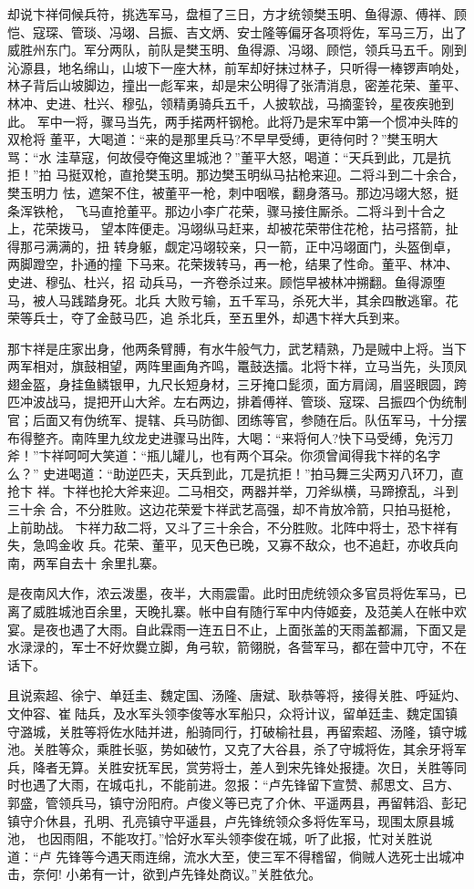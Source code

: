 却说卞祥伺候兵符，挑选军马，盘桓了三日，方才统领樊玉明、鱼得源、傅祥、顾
恺、寇琛、管琰、冯翊、吕振、吉文炳、安士隆等偏牙各项将佐，军马三万，出了
威胜州东门。军分两队，前队是樊玉明、鱼得源、冯翊、顾恺，领兵马五千。刚到
沁源县，地名绵山，山坡下一座大林，前军却好抹过林子，只听得一棒锣声响处，
林子背后山坡脚边，撞出一彪军来，却是宋公明得了张清消息，密差花荣、董平、
林冲、史进、杜兴、穆弘，领精勇骑兵五千，人披软战，马摘銮铃，星夜疾驰到此。
军中一将，骤马当先，两手掿两杆钢枪。此将乃是宋军中第一个惯冲头阵的双枪将
董平，大喝道：“来的是那里兵马?不早早受缚，更待何时？”樊玉明大骂：“水
洼草寇，何故侵夺俺这里城池？”董平大怒，喝道：“天兵到此，兀是抗拒！”拍
马挺双枪，直抢樊玉明。那边樊玉明纵马拈枪来迎。二将斗到二十余合，樊玉明力
怯，遮架不住，被董平一枪，刺中咽喉，翻身落马。那边冯翊大怒，挺条浑铁枪，
飞马直抢董平。那边小李广花荣，骤马接住厮杀。二将斗到十合之上，花荣拨马，
望本阵便走。冯翊纵马赶来，却被花荣带住花枪，拈弓搭箭，扯得那弓满满的，扭
转身躯，觑定冯翊较亲，只一箭，正中冯翊面门，头盔倒卓，两脚蹬空，扑通的撞
下马来。花荣拨转马，再一枪，结果了性命。董平、林冲、史进、穆弘、杜兴，招
动兵马，一齐卷杀过来。顾恺早被林冲搠翻。鱼得源堕马，被人马践踏身死。北兵
大败亏输，五千军马，杀死大半，其余四散逃窜。花荣等兵士，夺了金鼓马匹，追
杀北兵，至五里外，却遇卞祥大兵到来。

那卞祥是庄家出身，他两条臂膊，有水牛般气力，武艺精熟，乃是贼中上将。当下
两军相对，旗鼓相望，两阵里画角齐鸣，鼍鼓迭擂。北将卞祥，立马当先，头顶凤
翅金盔，身挂鱼鳞银甲，九尺长短身材，三牙掩口髭须，面方肩阔，眉竖眼圆，跨
匹冲波战马，提把开山大斧。左右两边，排着傅祥、管琰、寇琛、吕振四个伪统制
官；后面又有伪统军、提辖、兵马防御、团练等官，参随在后。队伍军马，十分摆
布得整齐。南阵里九纹龙史进骤马出阵，大喝：“来将何人?快下马受缚，免污刀
斧！”卞祥呵呵大笑道：“瓶儿罐儿，也有两个耳朵。你须曾闻得我卞祥的名字么？”
史进喝道：“助逆匹夫，天兵到此，兀是抗拒！”拍马舞三尖两刃八环刀，直抢卞
祥。卞祥也抡大斧来迎。二马相交，两器并举，刀斧纵横，马蹄撩乱，斗到三十余
合，不分胜败。这边花荣爱卞祥武艺高强，却不肯放冷箭，只拍马挺枪，上前助战。
卞祥力敌二将，又斗了三十余合，不分胜败。北阵中将士，恐卞祥有失，急鸣金收
兵。花荣、董平，见天色已晚，又寡不敌众，也不追赶，亦收兵向南，两军自去十
余里扎寨。

是夜南风大作，浓云泼墨，夜半，大雨震雷。此时田虎统领众多官员将佐军马，已
离了威胜城池百余里，天晚扎寨。帐中自有随行军中内侍姬妾，及范美人在帐中欢
宴。是夜也遇了大雨。自此霖雨一连五日不止，上面张盖的天雨盖都漏，下面又是
水渌渌的，军士不好炊爨立脚，角弓软，箭翎脱，各营军马，都在营中兀守，不在
话下。

且说索超、徐宁、单廷圭、魏定国、汤隆、唐斌、耿恭等将，接得关胜、呼延灼、
文仲容、崔陆兵，及水军头领李俊等水军船只，众将计议，留单廷圭、魏定国镇
守潞城，关胜等将佐水陆并进，船骑同行，打破榆社县，再留索超、汤隆，镇守城
池。关胜等众，乘胜长驱，势如破竹，又克了大谷县，杀了守城将佐，其余牙将军
兵，降者无算。关胜安抚军民，赏劳将士，差人到宋先锋处报捷。次日，关胜等同
时也遇了大雨，在城屯扎，不能前进。忽报：“卢先锋留下宣赞、郝思文、吕方、
郭盛，管领兵马，镇守汾阳府。卢俊义等已克了介休、平遥两县，再留韩滔、彭玘
镇守介休县，孔明、孔亮镇守平遥县，卢先锋统领众多将佐军马，现围太原县城池，
也因雨阻，不能攻打。”恰好水军头领李俊在城，听了此报，忙对关胜说道：“卢
先锋等今遇天雨连绵，流水大至，使三军不得稽留，倘贼人选死士出城冲击，奈何!
小弟有一计，欲到卢先锋处商议。”关胜依允。

